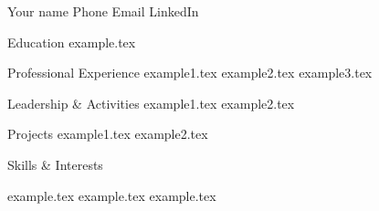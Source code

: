 \documentclass[11pt]{00_template}
\begin{document}
\begin{cv}

\cvheader
{Your name}
{Phone}
{Email}
{LinkedIn}

\begin{cvsection}{Education}
{example.tex}
\end{cvsection}

\begin{cvsection}{Professional Experience}
{example1.tex}
{example2.tex}
{example3.tex}
\end{cvsection}

\begin{cvsection}{Leadership \& Activities}
{example1.tex}
{example2.tex}
\end{cvsection}

\begin{cvsection}{Projects}
{example1.tex}
{example2.tex}
\end{cvsection}

\begin{cvsection}{Skills \& Interests}
\begin{cvlist}
    {example.tex}
    {example.tex}
    {example.tex}
\end{cvlist}
\end{cvsection}


\end{cv}
\end{document}
